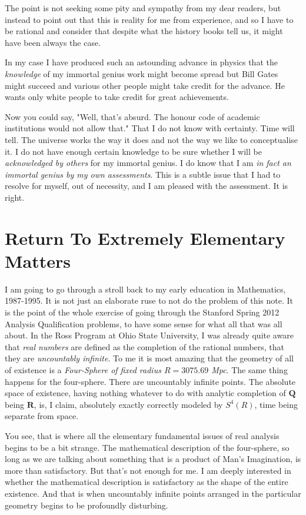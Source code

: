 \documentclass{amsart}
\begin{document}
The point is not seeking some pity and sympathy from my dear readers, but instead to point out that this is reality for me from experience, and so I have to be rational and consider that despite what the history books tell us, it might have been always the case.

In my case I have produced such an astounding advance in physics that the {\em knowledge} of my immortal genius work might become spread but Bill Gates might succeed and various other people might take credit for the advance.  He wants only white people to take credit for great achievements.

Now you could say, "Well, that's absurd.  The honour code of academic institutions would not allow that."  That I do not know with certainty.   Time will tell.  The universe works the way it does and not the way we like to conceptualise it.  I do not have enough certain knowledge to be sure whether I will be {\em acknowledged by others} for my immortal genius.  I do know that I am {\em in fact an immortal genius by my own assessments}.  This is a subtle issue that I had to resolve for myself, out of necessity, and I am pleased with the assessment.  It is right.

\section{Return To Extremely Elementary Matters}

I am going to go through a stroll back to my early education in Mathematics, 1987-1995.  It is not just an elaborate ruse to not do the problem of this note.  It is the point of the whole exercise of going through the Stanford Spring 2012 Analysis Qualification problems, to have some sense for what all that was all about.  In the Ross Program at Ohio State University, I was already quite aware that {\em real numbers} are defined as the completion of the rational numbers, that they are {\em uncountably infinite}.  To me it is most amazing that the geometry of all of existence is a {\em Four-Sphere of fixed radius $R=3075.69$ Mpc}. The same thing happens for the four-sphere.  There are uncountably infinite points.  The absolute space of existence, having nothing whatever to do with analytic completion of $\mathbf{Q}$ being $\mathbf{R}$, is, I claim, absolutely exactly correctly modeled by $S^4(R)$, time being separate from space.  

You see, that is where all the elementary fundamental issues of real analysis begins to be a bit strange. The mathematical description of the four-sphere, so long as we are talking about something that is a product of Man's Imagination, is more than satisfactory.  But that's not enough for me.  I am deeply interested in whether the mathematical description is satisfactory as the shape of the entire existence. And that is when uncountably infinite points arranged in the particular geometry begins to be profoundly disturbing.  
\end{document}
